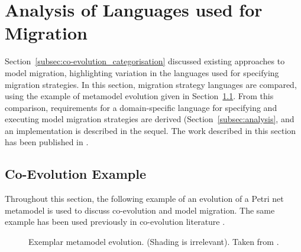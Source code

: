 
\section{Analysis of Languages used for Migration}
\label{sec:analyis_of_languages_used_for_migration}
Section~\ref{subsec:co-evolution_categorisation} discussed existing approaches to model migration, highlighting variation in the languages used for specifying migration strategies. In this section, migration strategy languages are compared, using the example of metamodel evolution given in Section~\ref{subsec:co-evo_example}. From this comparison, requirements for a domain-specific language for specifying and executing model migration strategies are derived (Section~\ref{subsec:analysis}, and an implementation is described in the sequel. The work described in this section has been published in \cite{rose10flock}.

\subsection{Co-Evolution Example}
\label{subsec:co-evo_example}
Throughout this section, the following example of an evolution of a Petri net metamodel is used to discuss co-evolution and model migration. The same example has been used previously in co-evolution literature \cite{cicchetti08automating,garces09managing,wachsmuth07metamodel}.

\begin{figure}[bp]
	\centering
	\caption[Exemplar metamodel evolution (Petri nets)]{Exemplar metamodel evolution. (Shading is irrelevant). Taken from \cite{rose10flock}.}
\label{fig:petri_nets_mms}
\end{figure}

